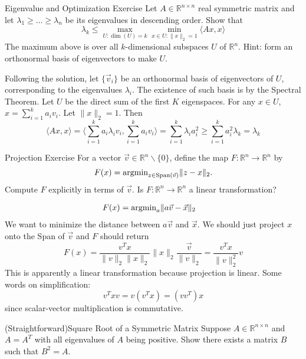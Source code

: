 \documentclass[../main]{subfiles}
\begin{document}
\begin{bbox}{Eigenvalue and Optimization Exercise}
    Let $A\in \mathbb R^{n\times n}$ real symmetric matrix and let $\lambda_1\ge \dots \ge \lambda_n$ be its eigenvalues in descending order. Show that 
    \[
    \lambda_k \le \max_{U: \dim(U) = k}\min_{x\in U: \|x\|_2 = 1} \langle Ax, x\rangle
    \]
    The maximum above is over all $k$-dimensional subspaces $U$ of $\mathbb R^n$. Hint: form an orthonormal basis of eigenvectors to make $U$.
\end{bbox}
\begin{solution}
    Following the solution, let $\{\vec v_i\}$ be an orthonormal basis of eigenvectors of $U$, corresponding to the eigenvalues $\lambda_i$. The existence of such basis is by the Spectral Theorem.
    Let $U$ be the direct sum of the first $K$ eigenspaces. For any $x\in U$, $x = \sum_{i=1}^k a_i v_i$.
    Let $\|x\|_2 = 1$. Then 
    \[
    \langle Ax, x\rangle = \langle \sum^k_{i=1} a_i \lambda_i v_i, \sum_{i=1}^k a_i v_i\rangle = \sum_{i=1}^k \lambda_i a_i^2 \ge \sum_{i=1}^k a_i^2\lambda_k = \lambda_k
    \]
\end{solution}
\begin{bbox}{Projection Exercise}
    For a vector $\vec v \in \mathbb R^n \backslash \{0\}$, define the map $F: \mathbb R^n \to \mathbb R^n$ by 
    \[
    F(x) = \text{argmin}_{z\in \text{Span}(\vec v)}\|z-x\|_2. 
    \]
    Compute $F$ explicitly in terms of $\vec v$. Is $F: \mathbb R^n \to \mathbb R^n$ a linear transformation?
\end{bbox}
\begin{solution}
    \begin{align*}
        F(x) &= \text{argmin}_{a}\|a\vec v - \vec x\|_2
    \end{align*}
    We want to minimize the distance between $a\vec v$ and $\vec x$. We should just project $x$ onto the Span of $\vec v$ and $F$ should return
    \[
    F(x) = \frac{v^Tx}{\|v\|_2\|x\|_2} \|x\|_2\frac{\vec v}{\|v\|_2} = \frac{v^T x}{\|v\|_2^2}v
    \]
    This is apparently a linear transformation because projection is linear.
    \newline
    Some words on simplification:
    \[
    v^T x v = v(v^T x)=(vv^T)x
    \] since scalar-vector multiplication is commutative.
\end{solution}
\begin{bbox}{(Straightforward)Square Root of a Symmetric Matrix}
    Suppose $A \in \mathbb R^{n\times n}$ and $A=A^T$ with all eigenvalues of $A$ being positive. Show there exists a matrix $B$ such that $B^2 = A$.
\end{bbox}
\end{document}
